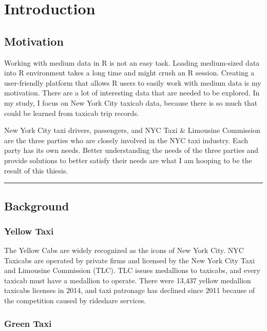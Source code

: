 \documentclass[12pt,twoside]{reedthesis}
\theoremstyle{definition}
\theoremstyle{definition}
\theoremstyle{definition}
\theoremstyle{remark}
\begin{document}
\mainmatter %
\pagestyle{fancyplain} %

\chapter{Introduction}\label{introduction}

\section{Motivation}\label{motivation}

Working with medium data in R is not an easy task. Loading medium-sized
data into R environment takes a long time and might crush an R session.
Creating a user-friendly platform that allows R users to easily work
with medium data is my motivation. There are a lot of interesting data
that are needed to be explored. In my study, I focus on New York City
taxicab data, because there is so much that could be learned from
taxicab trip records.

New York City taxi drivers, passengers, and NYC Taxi \& Limousine
Commission are the three parties who are closely involved in the NYC
taxi industry. Each party has its own needs. Better understanding the
needs of the three parties and provide solutions to better satisfy their
needs are what I am hooping to be the result of this thiesis.
\begin{center}\rule{0.5\linewidth}{\linethickness}\end{center}

\section{Background}\label{background}

\subsection{Yellow Taxi}\label{yellow-taxi}

The Yellow Cabs are widely recognized as the icons of New York City. NYC
Taxicabs are operated by private firms and licensed by the New York City
Taxi and Limousine Commission (TLC). TLC issues medallions to taxicabs,
and every taxicab must have a medallion to operate. There were 13,437
yellow medallion taxicabs licenses in 2014, and taxi patronage has
declined since 2011 because of the competition caused by rideshare
services.

\subsection{Green Taxi}\label{green-taxi}
\end{document}
